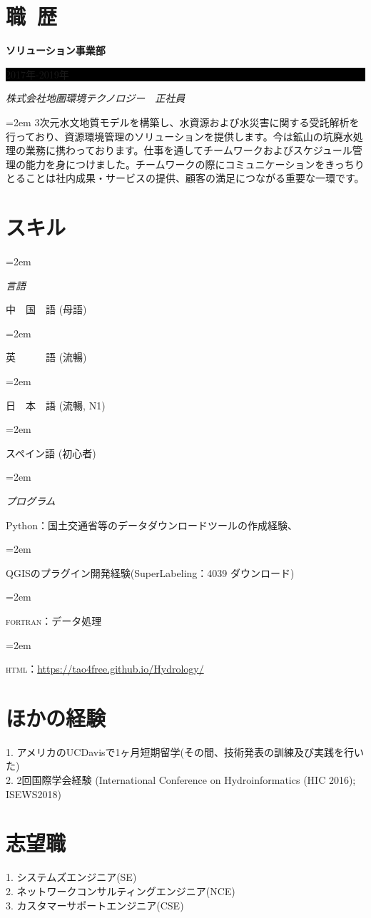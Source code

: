 \documentclass[paper=a4,fontsize=10.5pt]{scrartcl} %
\newlength{\spacebox}
\newcommand{\sepspace}{\vspace*{0em}}		%
\newcommand{\NewPart}[1]{\section*{\uppercase{#1}}}
\newcommand{\PersonalEntry}[2]{
		\noindent\hangindent=2em\hangafter=0 %
		\parbox{\spacebox}{        %
		\textit{#1}}		       %
		\hspace{1.5em} #2 \par}    %
\newcommand{\SkillsEntry}[2]{      %
		\noindent\hangindent=2em\hangafter=0 %
		\parbox{\spacebox}{        %
		\textit{#1}}			   %
		\hspace{1.5em} #2 \par}    %
\newcommand{\EducationEntry}[4]{
		\noindent \textbf{#1} \hfill      %
		\colorbox{Black}{%
			\parbox{7em}{%
			\hfill\color{White}#2}} \par  %
		\noindent \textit{#3} \par        %
		\noindent\hangindent=2em\hangafter=0 \small #4 %
		\normalsize \par}
\begin{document}
\vspace{-1.1\baselineskip}
\NewPart{職\ 歴}{}

\EducationEntry{ソリューション事業部}{2017年-2019年}{株式会社地圏環境テクノロジー　正社員}{3次元水文地質モデルを構築し、水資源および水災害に関する受託解析を行っており、資源環境管理のソリューションを提供します。今は鉱山の坑廃水処理の業務に携わっております。仕事を通してチームワークおよびスケジュール管理の能力を身につけました。チームワークの際にコミュニケーションをきっちりとることは社内成果・サービスの提供、顧客の満足につながる重要な一環です。}


\vspace{-1.1\baselineskip}
\NewPart{スキル}{}

\SkillsEntry{言語}{中　国　語 (母語)}
\SkillsEntry{}{英　　　語 (流暢)}
\SkillsEntry{}{日　本　語 (流暢, N1)}
\SkillsEntry{}{スペイン語 (初心者)}

\SkillsEntry{プログラム}{Python：国土交通省等のデータダウンロードツールの作成経験、}
\SkillsEntry{}{QGISのプラグイン開発経験(SuperLabeling：4039 ダウンロード)}
\SkillsEntry{}{\textsc{fortran：}データ処理}
\SkillsEntry{}{\textsc{html：}\url {https://tao4free.github.io/Hydrology/}}


\vspace{-1.1\baselineskip}
\NewPart{ほかの経験}{}
1. アメリカのUCDavisで1ヶ月短期留学(その間、技術発表の訓練及び実践を行いた)\\
2. 2回国際学会経験 (International Conference on Hydroinformatics (HIC 2016); ISEWS2018)

\vspace{-1.1\baselineskip}
\NewPart{志望職}{}
1. システムズエンジニア(SE)\\
2. ネットワークコンサルティングエンジニア(NCE) \\
3. カスタマーサポートエンジニア(CSE)
\end{document}
